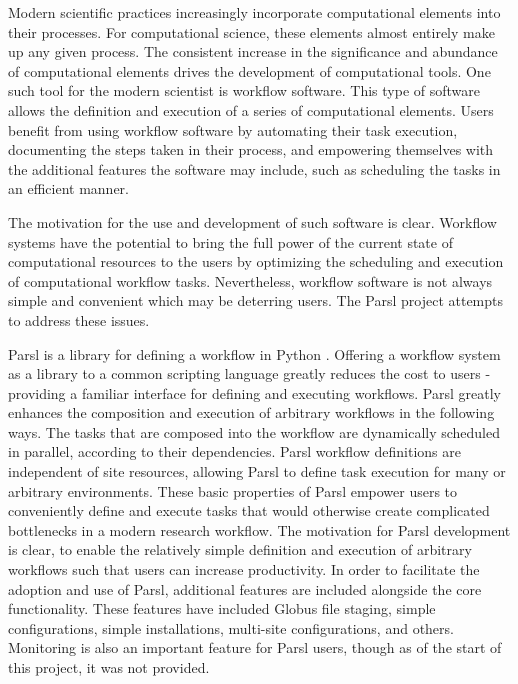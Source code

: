 Modern scientific practices increasingly incorporate computational elements into their processes.
For computational science, these elements almost entirely make up any given process.
The consistent increase in the significance and abundance of computational elements drives the development of computational tools.
One such tool for the modern scientist is workflow software.
This type of software allows the definition and execution of a series of computational elements.
Users benefit from using workflow software by automating their task execution, documenting the steps taken in their process, and empowering themselves with the additional features the software may include, such as scheduling the tasks in an efficient manner.

The motivation for the use and development of such software is clear.
Workflow systems have the potential to bring the full power of the current state of computational resources to the users by optimizing the scheduling and execution of computational workflow tasks.
Nevertheless, workflow software is not always simple and convenient which may be deterring users.
The Parsl project attempts to address these issues.

Parsl is a library for defining a workflow in Python \cite{babuji_yadu_2017_853492}.
Offering a workflow system as a library to a common scripting language greatly reduces the cost to users - providing a familiar interface for defining and executing workflows.
Parsl greatly enhances the composition and execution of arbitrary workflows in the following ways.
The tasks that are composed into the workflow are dynamically scheduled in parallel, according to their dependencies.
Parsl workflow definitions are independent of site resources, allowing Parsl to define task execution for many or arbitrary environments.
These basic properties of Parsl empower users to conveniently define and execute tasks that would otherwise create complicated bottlenecks in a modern research workflow.
The motivation for Parsl development is clear, to enable the relatively simple definition and execution of arbitrary workflows such that users can increase productivity.
In order to facilitate the adoption and use of Parsl, additional features are included alongside the core functionality.
These features have included Globus file staging, simple configurations, simple installations, multi-site configurations, and others.
Monitoring is also an important feature for Parsl users, though as of the start of this project, it was not provided.


